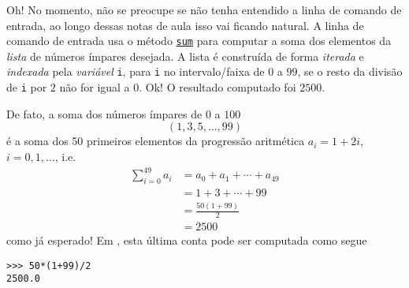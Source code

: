 Oh! No momento, não se preocupe se não tenha entendido a linha de comando de entrada, ao longo dessas notas de aula isso vai ficando natural. A linha de comando de entrada usa o método \href{https://docs.python.org/3/library/functions.html\#sum}{\lstinline+sum+} para computar a soma dos elementos da \emph{lista} de números ímpares desejada. A lista é construída de forma \emph{iterada} e \emph{indexada} pela \emph{variável} \lstinline+i+, para \lstinline+i+ no intervalo/faixa de $0$ a $99$, se o resto da divisão de \lstinline+i+ por $2$ não for igual a $0$. Ok! O resultado computado foi $2500$.

De fato, a soma dos números ímpares de $0$ a $100$
\begin{equation}
  (1, 3, 5, \dotsc, 99)
\end{equation}
é a soma dos 50 primeiros elementos da progressão aritmética $a_i = 1 + 2i$, $i=0, 1, \ldots$, i.e.
\begin{align}
  \sum_{i=0}^{49}a_i &= a_0 + a_1 + \cdots + a_{49}\\
                     &= 1 + 3 + \cdots + 99\\
                     &= \frac{50(1 + 99)}{2}\\
                     &= 2500
\end{align}
como já esperado! Em {\python}, esta última conta pode ser computada como segue

\begin{lstlisting}
>>> 50*(1+99)/2
2500.0
\end{lstlisting}
